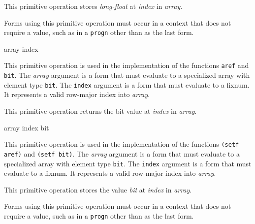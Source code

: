 This primitive operation stores \textit{long-float} at \textit{index}
in \textit{array}.

Forms using this primitive operation must occur in a context that does
not require a value, such as in a \texttt{progn} other than as the
last form.

 {array index}

This primitive operation is used in the implementation of the
\commonlisp{} functions \texttt{aref} and \texttt{bit}.  The
\textit{array} argument is a form that must evaluate to a specialized
array with element type \texttt{bit}.  The \texttt{index} argument is
a form that must evaluate to a fixnum.  It represents a valid
row-major index into \textit{array}.

This primitive operation returns the bit value at \textit{index} in
\textit{array}.

 {array index bit}

This primitive operation is used in the implementation of the
\commonlisp{} functions \texttt{(setf aref)} and \texttt{(setf bit)}.
The \textit{array} argument is a form that must evaluate to a
specialized array with element type \texttt{bit}.  The \texttt{index}
argument is a form that must evaluate to a fixnum.  It represents a
valid row-major index into \textit{array}.

This primitive operation stores the value \textit{bit} at
\textit{index} in \textit{array}.

Forms using this primitive operation must occur in a context that does
not require a value, such as in a \texttt{progn} other than as the
last form.
